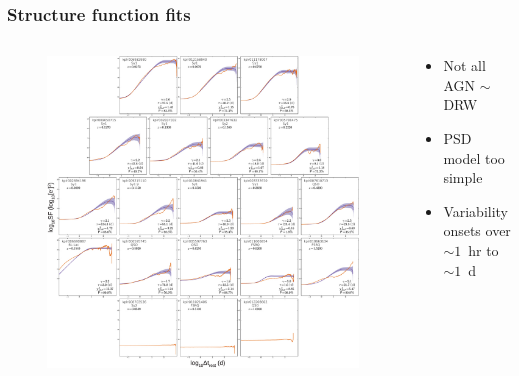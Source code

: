 \documentclass[hyperref={pdfpagelabels=false}]{beamer}
\begin{document}
\begin{frame}
\frametitle{Structure function fits}
  \begin{columns}
    \centering
    \begin{column}{0.65\textwidth}
      \begin{figure}
        \includegraphics[scale=0.45]{images/AllSF.jpg}
      \end{figure}
    \end{column}
    \begin{column}{0.35\textwidth}
        \begin{itemize}
        \item Not all AGN $\sim$ DRW
        \item PSD model too simple
        \item Variability onsets over $\sim 1$~hr to $\sim 1$~d
        \end{itemize}
          {\tiny \citet*{Kasliwal15}}
    \end{column}
  \end{columns}
\end{frame}
\end{document}
